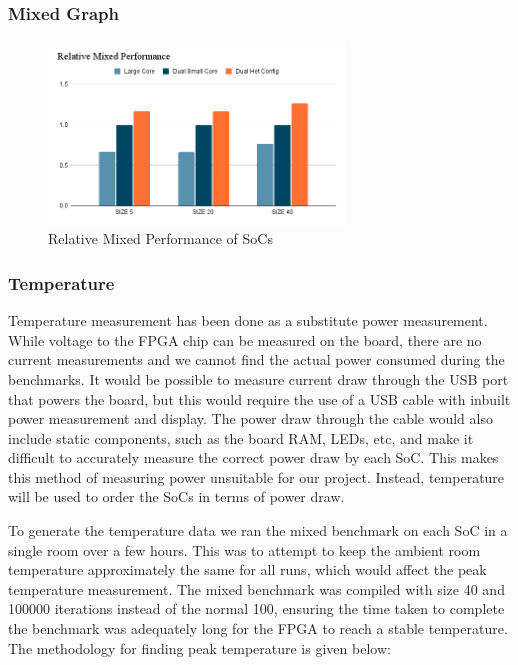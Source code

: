 \subsubsection{Mixed Graph}

\begin{figure}[H]
    \centering
    \includegraphics[width=0.7\textwidth]{img/Relative Mixed Performance.png}
    \caption{Relative Mixed Performance of SoCs}
    \label{fig:mix_relative_graph}
\end{figure}

\subsubsection{Temperature}
Temperature measurement has been done as a substitute power measurement. While voltage to the FPGA chip can be measured on the board, there are no current measurements and we cannot find the actual power consumed during the benchmarks. It would be possible to measure current draw through the USB port that powers the board, but this would require the use of a USB cable with inbuilt power measurement and display. The power draw through the cable would also include static components, such as the board RAM, LEDs, etc, and make it difficult to accurately measure the correct power draw by each SoC. This makes this method of measuring power unsuitable for our project. Instead, temperature will be used to order the SoCs in terms of power draw. 

To generate the temperature data we ran the mixed benchmark on each SoC in a single room over a few hours. This was to attempt to keep the ambient room temperature approximately the same for all runs, which would affect the peak temperature measurement. The mixed benchmark was compiled with size 40 and 100000 iterations instead of the normal 100, ensuring the time taken to complete the benchmark was adequately long for the FPGA to reach a stable temperature. The methodology for finding peak temperature is given below:

